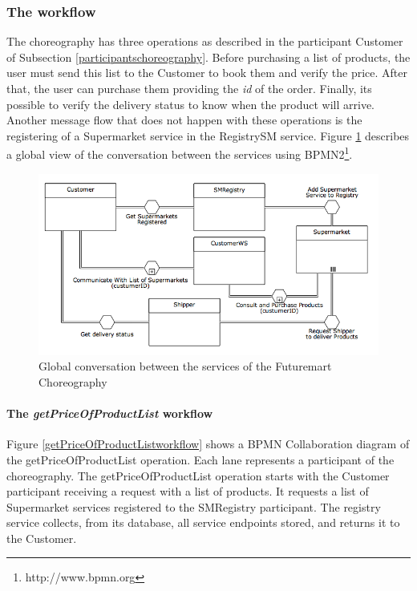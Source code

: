 \subsubsection{The workflow}
The choreography has three operations as described in the participant Customer of Subsection \ref{participantschoreography}. Before purchasing a list of products, the user must send this list to the Customer to book them and verify the price. After that, the user can purchase them providing the \emph{id} of the order. Finally, its possible to verify the delivery status to know when the product will arrive. Another message flow that does not happen with these operations is the registering of a Supermarket service in the RegistrySM service. Figure \ref{futuremartConversation} describes a global view of the conversation between the services using BPMN2\footnote{http://www.bpmn.org}.

\begin{figure}[htbp]
\begin{center}
	\includegraphics[width=\textwidth]{images/futuremartConversation}
\caption{Global conversation between the services of the Futuremart Choreography}
\label{futuremartConversation}
\end{center}
\end{figure}

\paragraph{The \emph{getPriceOfProductList} workflow\\}
Figure \ref{getPriceOfProductListworkflow} shows a BPMN Collaboration diagram of the getPriceOfProductList operation. Each lane represents a participant of the choreography. The getPriceOfProductList operation starts with the Customer participant receiving a request with a list of products. It requests a list of Supermarket services registered to the SMRegistry participant. The registry service collects, from its database, all service endpoints stored, and returns it to the Customer.

